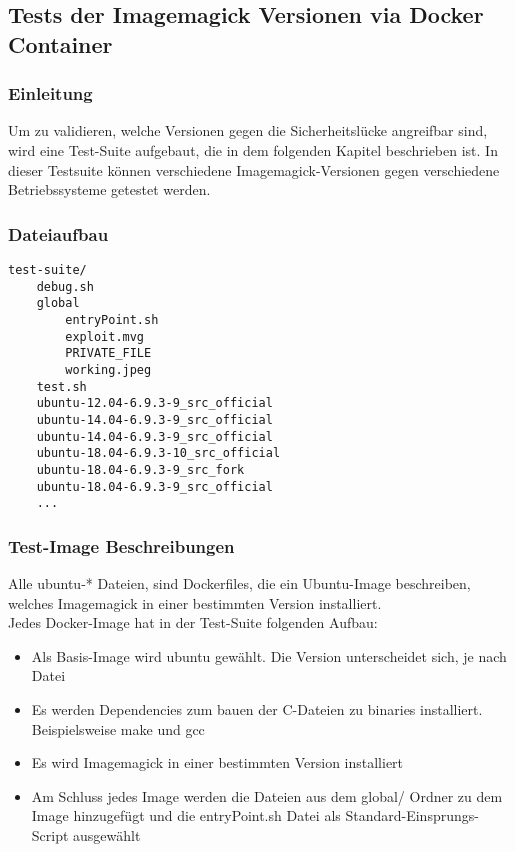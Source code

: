 \newpage
\subsection{Tests der Imagemagick Versionen via Docker Container}\label{subsec:tests-der-imagemagick-versionen-via-docker-container}

\subsubsection{Einleitung}

Um zu validieren, welche Versionen gegen die Sicherheitslücke angreifbar sind, wird eine Test-Suite aufgebaut,
die in dem folgenden Kapitel beschrieben ist.
In dieser Testsuite können verschiedene Imagemagick-Versionen gegen verschiedene Betriebssysteme getestet werden.

\subsubsection{Dateiaufbau}

\begin{lstlisting}[language=Text, caption=Übersicht über alle Dateien in der Testsuite,label={lst:testsuiteoverview}]
test-suite/
    debug.sh
    global
        entryPoint.sh
        exploit.mvg
        PRIVATE_FILE
        working.jpeg
    test.sh
    ubuntu-12.04-6.9.3-9_src_official
    ubuntu-14.04-6.9.3-9_src_official
    ubuntu-14.04-6.9.3-9_src_official
    ubuntu-18.04-6.9.3-10_src_official
    ubuntu-18.04-6.9.3-9_src_fork
    ubuntu-18.04-6.9.3-9_src_official
    ...
\end{lstlisting}
\vspace{5mm}

\subsubsection{Test-Image Beschreibungen}

Alle ubuntu-* Dateien, sind Dockerfiles, die ein Ubuntu-Image beschreiben,
welches Imagemagick in einer bestimmten Version installiert.\\

Jedes Docker-Image hat in der Test-Suite folgenden Aufbau:\\

\begin{itemize}
    \item Als Basis-Image wird ubuntu gewählt.
    Die Version unterscheidet sich, je nach Datei
    \item Es werden Dependencies zum bauen der C-Dateien zu binaries installiert.
    Beispielsweise make und gcc
    \item Es wird Imagemagick in einer bestimmten Version installiert
    \item Am Schluss jedes Image werden die Dateien aus dem global/ Ordner zu dem Image hinzugefügt und die entryPoint.sh Datei als Standard-Einsprungs-Script ausgewählt
\end{itemize}

